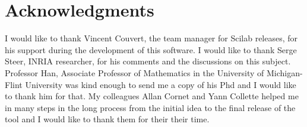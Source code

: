 %

\chapter{Acknowledgments}

I would like to thank Vincent Couvert, 
the team manager for Scilab releases, for his support 
during the development of this software. I would like to thank 
Serge Steer, INRIA researcher, for his comments and the discussions 
on this subject. Professor Han, Associate Professor of Mathematics in the 
University of Michigan-Flint University was kind enough to send me a copy
of his Phd and I would like to thank him for that.
My colleagues Allan Cornet and Yann Collette helped me in many 
steps in the long process from the initial idea to the final 
release of the tool and I would like to thank them for their
their time.

